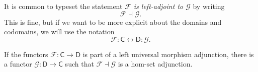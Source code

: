 \documentclass[notes.tex]{subfiles}
\begin{document}
\begin{note}
  It is common to typeset the statement \emph{$\mathcal{F}$ is left-adjoint to $\mathcal{G}$} by writing
  \begin{equation*}
    \mathcal{F} \dashv \mathcal{G}.
  \end{equation*}
  This is fine, but if we want to be more explicit about the domains and codomains, we will use the notation
  \begin{equation*}
    \mathcal{F} : \mathsf{C} \leftrightarrow \mathsf{D} : \mathcal{G}.
  \end{equation*}
\end{note}

\begin{lemma}
  \label{lemma:universal_morphism_adjunction_implies_hom_set_adjunction}
  If the functors $\mathcal{F}\colon \mathsf{C} \to \mathsf{D}$ is part of a left universal morphism adjunction, there is a functor $\mathcal{G}\colon \mathsf{D} \to \mathsf{C}$ such that $\mathcal{F} \dashv \mathcal{G}$ is a hom-set adjunction.
\end{lemma}
\end{document}
